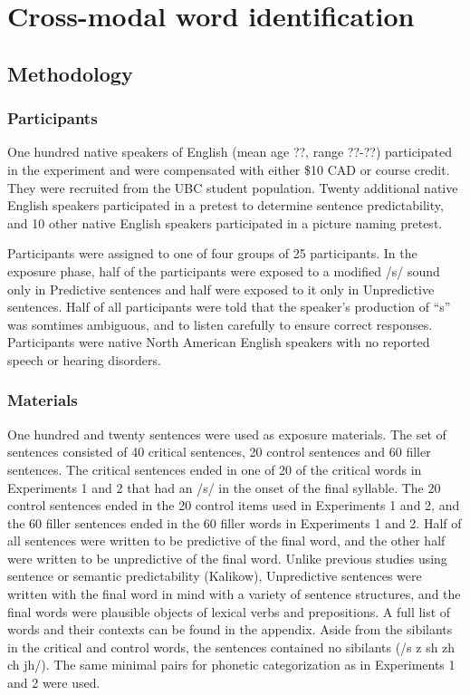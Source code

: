 
\chapter{Cross-modal word identification}

\section{Methodology}

\subsection{Participants}

One hundred native speakers of English (mean age ??, range ??-??) participated in the experiment and were compensated with either \$10 CAD or course credit. They were recruited from the UBC student population.  Twenty additional native English speakers participated in a pretest to determine sentence predictability, and 10 other native English speakers participated in a picture naming pretest.

Participants were assigned to one of four groups of 25 participants.  In the exposure phase, half of the participants were exposed to a modified /s/ sound only in Predictive sentences and half were exposed to it only in Unpredictive sentences.  Half of all participants were told that the speaker's production of ``s'' was somtimes ambiguous, and to listen carefully to ensure correct responses.  Participants were native North American English speakers with no reported speech or hearing disorders.

\subsection{Materials}

One hundred and twenty sentences were used as exposure materials.  The set of sentences consisted of 40 critical sentences, 20 control sentences and 60 filler sentences.  The critical sentences ended in one of 20 of the critical words in Experiments 1 and 2 that had an /s/ in the onset of the final syllable.  The 20 control sentences ended in the 20 control items used in Experiments 1 and 2, and the 60 filler sentences ended in the 60 filler words in Experiments 1 and 2.  Half of all sentences were written to be predictive of the final word, and the other half were written to be unpredictive of the final word.  Unlike previous studies using sentence or semantic predictability (Kalikow), Unpredictive sentences were written with the final word in mind with a variety of sentence structures, and the final words were plausible objects of lexical verbs and prepositions.  A full list of words and their contexts can be found in the appendix. Aside from the sibilants in the critical and control words, the sentences contained no sibilants (/s z sh zh ch jh/).  The same minimal pairs for phonetic categorization as in Experiments 1 and 2 were used.

